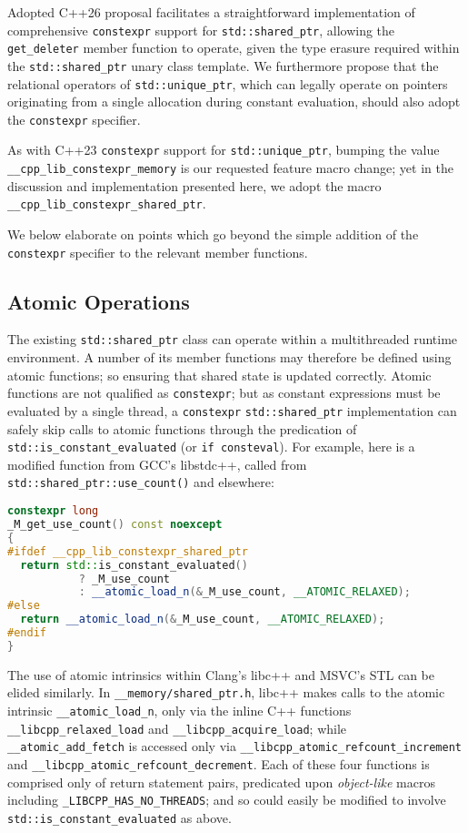 \documentclass[10pt]{article}
\begin{document}
Adopted C++26 proposal \cite{P2738R1} facilitates a straightforward
implementation of comprehensive \texttt{constexpr} support for
\texttt{std::shared\_ptr}, allowing the \texttt{get\_deleter} member function
to operate, given the type erasure required within the
\texttt{std::shared\_ptr} unary class template. We furthermore propose that the
relational operators of \texttt{std::unique\_ptr}, which can legally operate on
pointers originating from a single allocation during constant evaluation,
should also adopt the \texttt{constexpr} specifier.

As with C++23 \texttt{constexpr} support for \texttt{std::unique\_ptr}, bumping
the value \texttt{\_\_cpp\_lib\_constexpr\_memory} is our requested feature
macro change; yet in the discussion and implementation presented here, we adopt
the macro \texttt{\_\_cpp\_lib\_constexpr\_shared\_ptr}.

We below elaborate on points which go beyond the simple addition of the
\texttt{constexpr} specifier to the relevant member functions.

\subsection{Atomic Operations}

The existing \texttt{std::shared\_ptr} class can operate within a multithreaded
runtime environment. A number of its member functions may therefore be defined
using atomic functions; so ensuring that shared state is updated correctly.
Atomic functions are not qualified as \texttt{constexpr}; but as constant
expressions must be evaluated by a single thread, a \texttt{constexpr}
\texttt{std::shared\_ptr} implementation can safely skip calls to atomic
functions through the predication of \texttt{std::is\_constant\_evaluated} (or
\texttt{if consteval}). For example, here is a modified function from GCC's
libstdc++, called from \texttt{std::shared\_ptr::use\_count()} and elsewhere:

\begin{lstlisting}[language=cpp]
constexpr long
_M_get_use_count() const noexcept
{
#ifdef __cpp_lib_constexpr_shared_ptr
  return std::is_constant_evaluated()
           ? _M_use_count
           : __atomic_load_n(&_M_use_count, __ATOMIC_RELAXED);
#else
  return __atomic_load_n(&_M_use_count, __ATOMIC_RELAXED);
#endif
}
\end{lstlisting}

The use of atomic intrinsics within Clang's libc++ and MSVC's STL can be elided
similarly. In \texttt{\_\_memory/shared\_ptr.h}, libc++ makes calls to the
atomic intrinsic \texttt{\_\_atomic\_load\_n}, only via the inline C++
functions \texttt{\_\_libcpp\_relaxed\_load} and
\texttt{\_\_libcpp\_acquire\_load}; while \texttt{\_\_atomic\_add\_fetch} is
accessed only via \texttt{\_\_libcpp\_atomic\_refcount\_increment} and
\texttt{\_\_libcpp\_atomic\_refcount\_decrement}. Each of these four functions
is comprised only of return statement pairs, predicated upon \emph{object-like}
macros including \texttt{\_LIBCPP\_HAS\_NO\_THREADS}; and so could easily be
modified to involve \texttt{std::is\_constant\_evaluated} as above.
\end{document}
